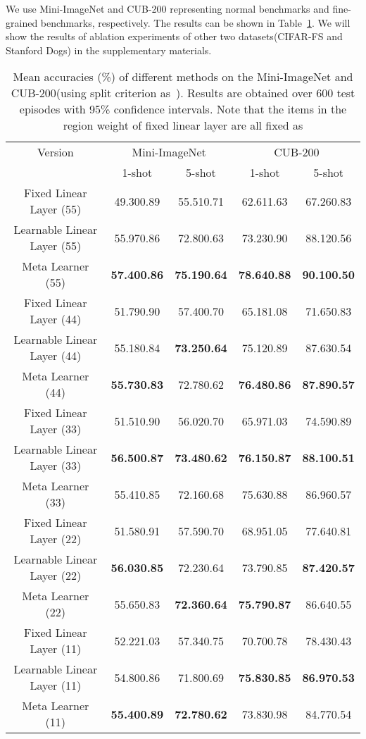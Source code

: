 \documentclass[letterpaper]{article}
\begin{document}
We use Mini-ImageNet and CUB-200 representing normal benchmarks and fine-grained benchmarks, respectively. The results can be shown in Table~\ref{table: ablation}. We will show the results of ablation experiments of other two datasets(CIFAR-FS and Stanford Dogs) in the supplementary materials. 

\begin{table}[h]\tiny
\begin{center}
\label{table: ablation}
\caption{Mean accuracies (\%) of different methods on the Mini-ImageNet and CUB-200(using split criterion as~\cite{li2019revisiting}). Results are obtained over 600 test episodes with 95\% confidence intervals. Note that the items in the region weight of fixed linear layer are all fixed as } \label{table: ablation}
\begin{tabular}{c c c c c}
  \hline
   Version&\multicolumn{2}{c}{Mini-ImageNet}&\multicolumn{2}{c}{CUB-200}\\
   &1-shot & 5-shot & 1-shot & 5-shot \\ \hline
  \hline
  Fixed Linear Layer (55) & 49.300.89  & 55.510.71  & 62.611.63 & 67.260.83  \\
Learnable Linear Layer (55) & 55.970.86  & 72.800.63  & 73.230.90 & 88.120.56  \\
  Meta Learner (55) & \textbf{57.400.86} & \textbf{75.190.64} & \textbf{78.640.88} & \textbf{90.100.50}\\
  \hline
  Fixed Linear Layer (44)& 51.790.90 & 57.400.70 & 65.181.08 & 71.650.83\\
  Learnable Linear Layer (44) & 55.180.84 & \textbf{73.250.64} & 75.120.89 & 87.630.54  \\
  Meta Learner (44)& \textbf{55.730.83} & 72.780.62 & \textbf{76.480.86} & \textbf{87.890.57} \\
  \hline
  Fixed Linear Layer (33)& 51.510.90 & 56.020.70 & 65.971.03 & 74.590.89 \\
  Learnable Linear Layer (33) & \textbf{56.500.87}  & \textbf{73.480.62}  & \textbf{76.150.87} & \textbf{88.100.51}  \\
  Meta Learner (33)& 55.410.85 & 72.160.68 & 75.630.88 & 86.960.57 \\
\hline
  Fixed Linear Layer (22)& 51.580.91 & 57.590.70 & 68.951.05 & 77.640.81 \\
  Learnable Linear Layer (22) & \textbf{56.030.85} & 72.230.64 & 73.790.85 & \textbf{87.420.57}  \\
  Meta Learner (22)& 55.650.83 & \textbf{72.360.64} & \textbf{75.790.87} &  86.640.55\\
  \hline
  Fixed Linear Layer (11)& 52.221.03 & 57.340.75 & 70.700.78 & 78.430.43 \\
  Learnable Linear Layer (11) & 54.800.86  & 71.800.69  & \textbf{75.830.85} &  \textbf{86.970.53}  \\
  Meta Learner (11)& \textbf{55.400.89} &\textbf{72.780.62}  & 73.830.98 & 84.770.54 \\
  \hline
\end{tabular}
\end{center}
\end{table}
\end{document}
